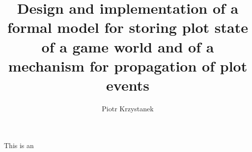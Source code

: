 \documentclass[magister,druk,en]{dyplom}
\author{Piotr Krzystanek}
\title{Design and implementation of a formal model for storing plot state of a game world and of a mechanism for propagation of plot events}
\begin{document}
\maketitle



\tableofcontents






This is an



\listoffigures
\listoflistings
\listoftables

\appendixpage
\appendix

\end{document}
